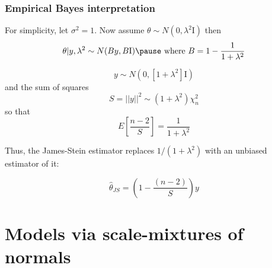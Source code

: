 \documentclass[handout]{beamer}
\newcommand{\I}{\mathrm{I}}
\begin{document}
\begin{frame}
\frametitle{Empirical Bayes interpretation}
\small

For simplicity, let $\sigma^2=1$. \pause Now assume $\theta \sim N(0,\lambda^2\I)$ \pause then 
\[ \theta|y,\lambda^2 \sim N(By,B\I) \pause \mbox{ where } B = 1-\frac{1}{1+\lambda^2} \]


\[ y \sim N(0,[1+\lambda^2]\I) \]
and the sum of squares
\[ S = ||y||^2\sim (1+\lambda^2) \chi^2_n \]
so that 
\[ E \left[ \frac{n-2}{S} \right] = \frac{1}{1+\lambda^2}  \]

Thus, the James-Stein estimator replaces $1/(1+\lambda^2)$ with an unbiased estimator of it:

\[ \hat{\theta}_{JS} = \left( 1-\frac{(n-2)}{S}\right)y \]

\end{frame}



\section{Models via scale-mixtures of normals}
\end{document}
